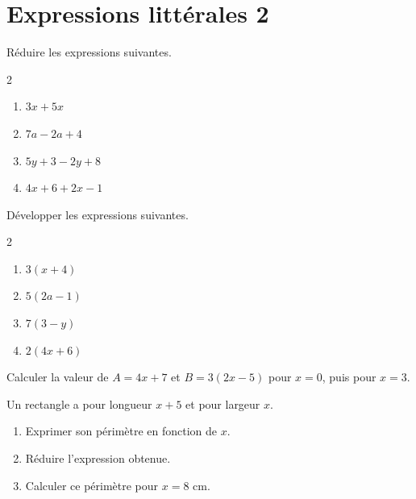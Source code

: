 \documentclass[a4paper,10pt]{report}
\begin{document}
\pagestyle{empty}
\section*{Expressions littérales 2}

\begin{ex}
Réduire les expressions suivantes.
\begin{multicols}{2}
\begin{enumerate}
\item $3x+5x$
\item $7a-2a+4$
\item $5y+3-2y+8$
\item $4x+6+2x-1$
\end{enumerate}
\end{multicols}
\end{ex}

\begin{ex}
Développer les expressions suivantes.
\begin{multicols}{2}
\begin{enumerate}
\item $3(x+4)$
\item $5(2a-1)$
\item $7(3-y)$
\item $2(4x+6)$
\end{enumerate}
\end{multicols}
\end{ex}

\begin{ex}
Calculer la valeur de $A=4x+7$ et $B=3(2x-5)$ pour $x=0$, puis pour $x=3$.
\end{ex}

\begin{ex}
Un rectangle a pour longueur $x+5$ et pour largeur $x$.
\begin{enumerate}
\item Exprimer son périmètre en fonction de $x$.
\item Réduire l'expression obtenue.
\item Calculer ce périmètre pour $x=8$ cm.
\end{enumerate}
\end{ex}
\end{document}
